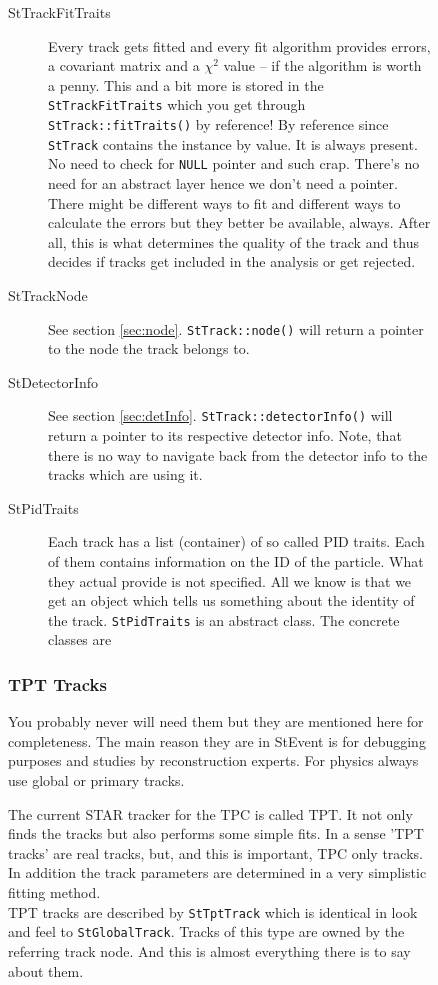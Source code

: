\documentclass[twoside]{article}
\begin{document}
\begin{figure}[htb]
\begin{center}
\begin{description}
\item[StTrackFitTraits]  Every track gets
    fitted and every fit algorithm provides errors, a covariant matrix
    and a $\chi^2$ value -- if the algorithm is worth a penny.  This
    and a bit more is stored in the \texttt{StTrackFitTraits} which
    you get through \texttt{StTrack::fitTraits()} by reference! By
    reference since \texttt{StTrack} contains the instance by value.
    It is always present. No need to check for \texttt{NULL} pointer
    and such crap. There's no need for an abstract
    layer hence we don't need a pointer.\\
    There might be different ways to fit and different ways to
    calculate the errors but they better be available, always. After
    all, this is what determines the quality of the track and thus
    decides if tracks get included in the analysis or get rejected.
    
\item[StTrackNode]  See section \ref{sec:node}.
    \texttt{StTrack::node()} will return a pointer to the node the
    track belongs to.
    
\item[StDetectorInfo]  See section
    \ref{sec:detInfo}.  \texttt{StTrack::detectorInfo()} will return a
    pointer to its respective detector info. Note, that there is no
    way to navigate back from the detector info to the tracks which
    are using it.
    
\item[StPidTraits]  Each track has a list
    (container) of so called PID traits. Each of them contains
    information on the ID of the particle. What they actual provide is
    not specified. All we know is that we get an object which tells us
    something about the identity of the track.  \texttt{StPidTraits}
    is an abstract class. The concrete classes are
\end{description}

\subsubsection{TPT Tracks}
\label{sec:tptTracks} 
You probably never will need them but they are mentioned here for completeness.
The main reason they are in StEvent is for debugging purposes and studies by reconstruction
experts. For physics always use global or primary tracks. 

The current STAR tracker for the TPC is called TPT. It not only finds the tracks
but also performs some simple fits. In a sense 'TPT tracks' are real tracks, but,
and this is important, TPC only tracks. In addition the track parameters are determined
in a very simplistic fitting method. \\
TPT tracks are described by \texttt{StTptTrack} which is identical in look and feel to
\texttt{StGlobalTrack}. Tracks of this type are owned by the referring track node.
And this is almost everything there is to say about them.


\end{center}
\end{figure}
\end{document}
